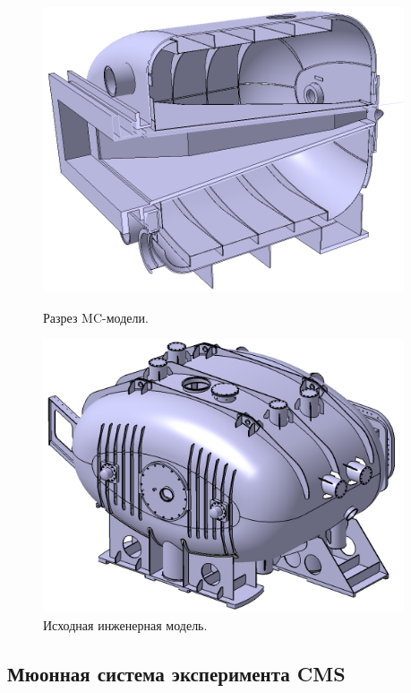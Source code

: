 \begin{figure}[H]
\begin{minipage}[b]{0.495\textwidth}
\includegraphics[width=0.95\textwidth]{pictures/GLAD3.png}
\caption{Разрез MC-модели.}
\label{fig:GLAD3}
\end{minipage}
\hspace{0.01\textwidth}
\begin{minipage}[b]{0.495\textwidth}
\includegraphics[width=0.95\textwidth]{pictures/R3B_GLAD_CAD.png}
\caption{Исходная инженерная модель.}
\label{fig:GLAD4}
\end{minipage}
\end{figure}

\subsection{Мюонная система эксперимента CMS}\label{sec:secCmsMuon}

